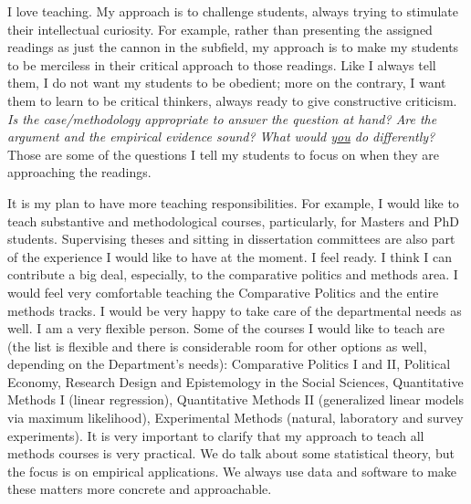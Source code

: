\documentclass[10pt,stdletter,dateno,sigleft]{newlfm} %
\begin{document}
\begin{newlfm}
I love teaching. My approach is to challenge students, always trying to stimulate their intellectual curiosity. For example, rather than presenting the assigned readings as just the cannon in the subfield, my approach is to make my students to be merciless in their critical approach to those readings. Like I always tell them, I do not want my students to be obedient; more on the contrary, I want them to learn to be critical thinkers, always ready to give constructive criticism. \emph{Is the case/methodology appropriate to answer the question at hand? Are the argument and the empirical evidence sound? What would \underline{you} do differently?} Those are some of the questions I tell my students to focus on when they are approaching the readings. 

It is my plan to have more teaching responsibilities. For example, I would like to teach substantive and methodological courses, particularly, for Masters and PhD students. Supervising theses and sitting in dissertation committees are also part of the experience I would like to have at the moment. I feel ready. I think I can contribute a big deal, especially, to the comparative politics and methods area. I would feel very comfortable teaching the Comparative Politics and the entire methods tracks. I would be very happy to take care of the departmental needs as well. I am a very flexible person. Some of the courses I would like to teach are (the list is flexible and there is considerable room for other options as well, depending on the Department's needs): Comparative Politics I and II, Political Economy, Research Design and Epistemology in the Social Sciences, Quantitative Methods I (linear regression), Quantitative Methods II (generalized linear models via maximum likelihood), Experimental Methods (natural, laboratory and survey experiments). It is very important to clarify that my approach to teach all methods courses is very practical. We do talk about some statistical theory, but the focus is on empirical applications. We always use data and software to make these matters more concrete and approachable.


\end{newlfm}
\end{document}
